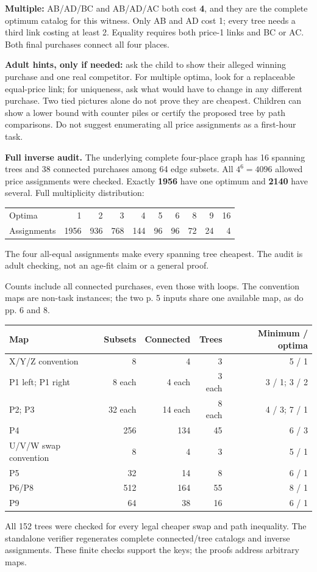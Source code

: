 \documentclass[11pt,letterpaper]{article}
\newcommand\topic[1]{\par\vspace{5pt}{\large\bfseries #1}\par}
\begin{document}
\textbf{Multiple:} AB/AD/BC and AB/AD/AC both cost \textbf{4}, and they are the complete optimum catalog for this witness. Only AB and AD cost 1; every tree needs a third link costing at least 2. Equality requires both price-1 links and BC or AC. Both final purchases connect all four places.

\textbf{Adult hints, only if needed:} ask the child to show their alleged winning purchase and one real competitor. For multiple optima, look for a replaceable equal-price link; for uniqueness, ask what would have to change in any different purchase. Two tied pictures alone do not prove they are cheapest. Children can show a lower bound with counter piles or certify the proposed tree by path comparisons. Do not suggest enumerating all price assignments as a first-hour task.

\textbf{Full inverse audit.} The underlying complete four-place graph has 16 spanning trees and 38 connected purchases among 64 edge subsets. All $4^6=4096$ allowed price assignments were checked. Exactly \textbf{1956} have one optimum and \textbf{2140} have several. Full multiplicity distribution:
\begin{center}
\begin{tabular}{lrrrrrrrrr}
\toprule Optima & 1 & 2 & 3 & 4 & 5 & 6 & 8 & 9 & 16\\
Assignments & 1956 & 936 & 768 & 144 & 96 & 96 & 72 & 24 & 4\\\bottomrule
\end{tabular}
\end{center}
The four all-equal assignments make every spanning tree cheapest. The audit is adult checking, not an age-fit claim or a general proof.

\topic{Coverage of every fixed available map}
Counts include all connected purchases, even those with loops. The convention maps are non-task instances; the two p. 5 inputs share one available map, as do pp. 6 and 8.
\begin{center}\small
\begin{tabular}{lrrrr}
\toprule Map & Subsets & Connected & Trees & Minimum / optima\\\midrule
X/Y/Z convention & 8 & 4 & 3 & 5 / 1\\
P1 left; P1 right & 8 each & 4 each & 3 each & 3 / 1; 3 / 2\\
P2; P3 & 32 each & 14 each & 8 each & 4 / 3; 7 / 1\\
P4 & 256 & 134 & 45 & 6 / 3\\
U/V/W swap convention & 8 & 4 & 3 & 5 / 1\\
P5 & 32 & 14 & 8 & 6 / 1\\
P6/P8 & 512 & 164 & 55 & 8 / 1\\
P9 & 64 & 38 & 16 & 6 / 1\\\bottomrule
\end{tabular}
\end{center}
All 152 trees were checked for every legal cheaper swap and path inequality. The standalone verifier regenerates complete connected/tree catalogs and inverse assignments. These finite checks support the keys; the proofs address arbitrary maps.
\endgroup
\newpage
\end{document}
